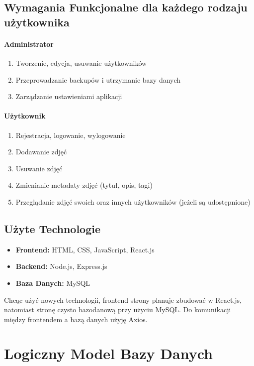 \documentclass[12pt,a4paper]{article}
\begin{document}
\subsection{Wymagania Funkcjonalne dla każdego rodzaju użytkownika}
\paragraph{Administrator}
\begin{enumerate}
    \item Tworzenie, edycja, usuwanie użytkowników
    \item Przeprowadzanie backupów i utrzymanie bazy danych
    \item Zarządzanie ustawieniami aplikacji
\end{enumerate}

\paragraph{Użytkownik}
\begin{enumerate}
    \item Rejestracja, logowanie, wylogowanie
    \item Dodawanie zdjęć
    \item Usuwanie zdjęć
    \item Zmienianie metadaty zdjęć (tytuł, opis, tagi)
    \item Przeglądanie zdjęć swoich oraz innych użytkowników (jeżeli są udostępnione)
\end{enumerate}

\subsection{Użyte Technologie}
\begin{itemize}
    \item \textbf{Frontend:} HTML, CSS, JavaScript, React.js
    \item \textbf{Backend:} Node.js, Express.js
    \item \textbf{Baza Danych:} MySQL
\end{itemize}
Chcąc użyć nowych technologii, frontend strony planuje zbudować w React.js, natomiast stronę czysto bazodanową przy użyciu MySQL. Do komunikacji między frontendem a bazą danych użyję Axios.

\section{Logiczny Model Bazy Danych}
\end{document}
